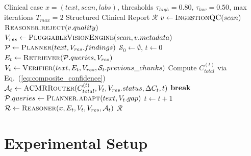 \documentclass[journal,10pt,twocolumn]{IEEEtran}
\begin{document}
\begin{algorithm}[t]
\caption{ACMR Dynamic Multimodal Execution Loop}
\begin{algorithmic}[1]
\REQUIRE Clinical case $x = (text, scan, labs)$, thresholds $\tau_{high}=0.80$, $\tau_{low}=0.50$, max iterations $T_{max}=2$
\ENSURE Structured Clinical Report $\mathcal{R}$
\STATE $v \leftarrow \textsc{IngestionQC}(scan)$
    \RETURN $\textsc{Reasoner.reject}(v.quality)$
\ENDIF
\STATE $V_{res} \leftarrow \textsc{PluggableVisionEngine}(scan, v.metadata)$
\STATE $\mathcal{P} \leftarrow \textsc{Planner}(text, V_{res}.findings)$
\STATE $\mathcal{S}_0 \leftarrow \emptyset$, $t \leftarrow 0$
    \STATE $E_t \leftarrow \textsc{Retriever}(\mathcal{P}.queries, V_{res})$
    \STATE $V_t \leftarrow \textsc{Verifier}(text, E_t, V_{res}, \mathcal{S}_t.previous\_chunks)$
    \STATE Compute $C_{total}^{(t)}$ via Eq.~(\ref{eq:composite_confidence})
    \STATE $\mathcal{A}_t \leftarrow \textsc{ACMRRouter}(C_{total}^{(t)}, V_t, V_{res}.status, \Delta C_t, t)$
        \STATE \textbf{break}
    \ENDIF
    \STATE $\mathcal{P}.queries \leftarrow \textsc{Planner.adapt}(text, V_t.gap)$
    \STATE $t \leftarrow t + 1$
\ENDWHILE
\STATE $\mathcal{R} \leftarrow \textsc{Reasoner}(x, E_t, V_t, V_{res}, \mathcal{A}_t)$
\RETURN $\mathcal{R}$
\end{algorithmic}
\label{alg:acmr}
\end{algorithm}

\section{Experimental Setup}
\end{document}
